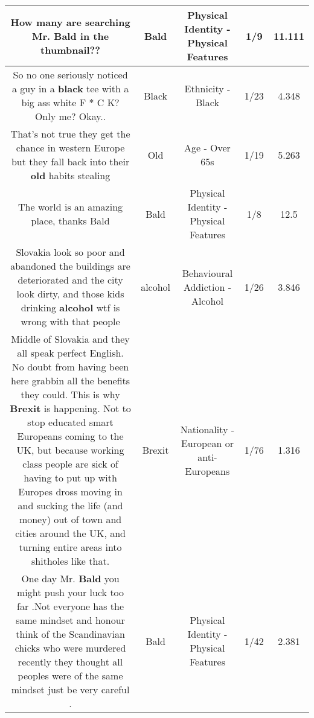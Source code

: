 \documentclass[11pt]{article}
\newlength\mylength
\begin{document}
\begin{center}
\begin{longtable}{|C{.65\mylength}|C{.30\mylength}|C{.12\mylength}|C{.12\mylength}|C{.12\mylength}|}
  \small How many are searching Mr. \textbf{Bald} in the thumbnail??\normalsize   & Bald & Physical Identity - Physical Features & 1/9 & 11.111 \\  \hline
  \small So no one seriously noticed a guy in a \textbf{black} tee with a big ass white F * C K? Only me? Okay..\normalsize   & Black & Ethnicity - Black & 1/23 & 4.348 \\  \hline
  \small That's not true they get the chance in western Europe but they fall back into their \textbf{old} habits stealing\normalsize   & Old & Age - Over 65s & 1/19 & 5.263 \\  \hline
  \small The world is an amazing place, thanks Bald\normalsize   & Bald & Physical Identity - Physical Features & 1/8 & 12.5 \\  \hline
  \small Slovakia look so poor and abandoned the buildings are deteriorated and the city look dirty, and those kids drinking \textbf{alcohol} wtf  is wrong with that people\normalsize   & alcohol & Behavioural Addiction - Alcohol & 1/26 & 3.846 \\  \hline
  \small Middle of Slovakia and they all speak perfect English.  No doubt from having been here grabbin all the benefits they could. This is why \textbf{Brexit} is happening. Not to stop educated smart Europeans coming to the UK, but because working class people are sick of having to put up with Europes dross moving in and sucking the life (and money) out of town and cities around the UK, and turning entire areas into shitholes like that.\normalsize   & Brexit & Nationality - European or anti-Europeans & 1/76 & 1.316 \\  \hline
  \small One day Mr. \textbf{Bald} you might push your luck too far .Not everyone has the same mindset and honour think of the Scandinavian chicks who were murdered recently they thought all peoples were of the same mindset just be very careful .\normalsize   & Bald & Physical Identity - Physical Features & 1/42 & 2.381 \\  \hline

\end{longtable}
\end{center}
\end{document}
